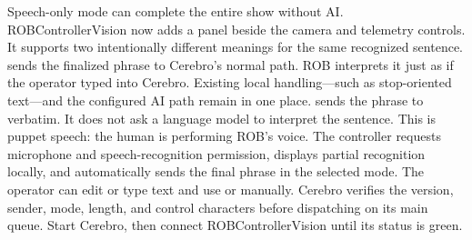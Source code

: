 \markdownRendererUlItem Speech-only mode can complete the entire show without AI.\markdownRendererUlItemEnd 
\markdownRendererUlEnd \markdownRendererInterblockSeparator
{}\markdownRendererThematicBreak{}\markdownRendererInterblockSeparator
{}
\markdownRendererSectionEnd 
\markdownRendererSectionEnd \markdownRendererSectionBegin
{}\markdownRendererInterblockSeparator
{}ROBControllerVision now adds a  panel beside the\markdownRendererSoftLineBreak
{}camera and telemetry controls. It supports two intentionally different\markdownRendererSoftLineBreak
{}meanings for the same recognized sentence.\markdownRendererParagraphSeparator
{} sends the finalized phrase to Cerebro's normal  path.\markdownRendererSoftLineBreak
{}ROB interprets it just as if the operator typed into Cerebro. Existing local\markdownRendererSoftLineBreak
{}handling—such as stop-oriented text—and the configured AI path remain in one\markdownRendererSoftLineBreak
{}place.\markdownRendererParagraphSeparator
{} sends the phrase to  verbatim. It does not ask a\markdownRendererSoftLineBreak
{}language model to interpret the sentence. This is puppet speech: the human is\markdownRendererSoftLineBreak
{}performing ROB's voice.\markdownRendererInterblockSeparator
{}\markdownRendererInterblockSeparator
{}The controller requests microphone and speech-recognition permission, displays\markdownRendererSoftLineBreak
{}partial recognition locally, and automatically sends the final phrase in the\markdownRendererSoftLineBreak
{}selected mode. The operator can edit or type text and use  or\markdownRendererSoftLineBreak
{} manually. Cerebro verifies the version, sender, mode, length,\markdownRendererSoftLineBreak
{}and control characters before dispatching on its main queue.\markdownRendererInterblockSeparator
{}\markdownRendererSectionBegin
{}\markdownRendererInterblockSeparator
{}\markdownRendererOlBegin
{}Start Cerebro, then connect ROBControllerVision until its status is green.\markdownRendererOlItemEnd 
